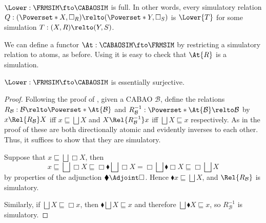 \documentclass[a4paper,UKenglish,cleveref, autoref]{lipics-v2021}
\begin{document}
\begin{lemma}
  \label{lemma:lower-frmsim-full}
  \(\Lower : \FRMSIM \fto \CABAOSIM\) is full. In other words, every simulatory
  relation
  \(Q : (\Powerset*{X}, \Box_R) \relto (\Powerset*{Y}, \Box_S)\)
  is \(\Lower{T}\) for some simulation \(T : (X, R) \relto (Y, S)\).
\end{lemma}

We can define a functor \(\At : \CABAOSIM \fto \FRMSIM\) by
restricting a simulatory relation to atoms, as before. Using
 it is easy to check that \(\At{R}\) is a
simulation.

\begin{lemma}
  \label{lemma:lower-frmsim-dense}
  \(\Lower : \FRMSIM \fto \CABAOSIM\) is essentially surjective.
\end{lemma}
\begin{proof}
  Following the proof of ,
  given a CABAO \(\mathcal{B}\), define the relations
  \(R_{\mathcal{B}} : \mathcal{B} \relto \Powerset*{\At{\mathcal{B}}}\) and
  \(R_{\mathcal{B}}^{-1} : \Powerset*{\At{\mathcal{B}}} \relto \mathcal{B}\)
  by
  \(x \Rel{R_{\mathcal{B}}} X\) iff \(x \sqsubseteq \bigsqcup X\)
  and
  \(X \Rel{R^{-1}_{\mathcal{B}}} x\) iff \(\bigsqcup X \sqsubseteq x\)
  respectively.
  As in the proof of  these are both directionally
  atomic and evidently inverses to each other. Thus, it suffices to show that
  they are simulatory.

  Suppose that \(x \sqsubseteq \bigsqcup \Box X\), then
  \[
    x
    \sqsubseteq \bigsqcup \Box X
    \sqsubseteq \Box \blacklozenge \bigsqcup \Box X
    = \Box \bigsqcup \blacklozenge \Box X
    \sqsubseteq \Box \bigsqcup X
  \]
  by properties of the adjunction $\blacklozenge \Adjoint \Box$.
  Hence $\blacklozenge x \sqsubseteq \bigsqcup X$, and $\Rel{R_\mathcal{B}}$ is
  simulatory.

  Similarly, if \(\bigsqcup X \sqsubseteq \Box x\), then \(\blacklozenge
  \bigsqcup X \sqsubseteq x\) and therefore \(\bigsqcup \blacklozenge X
  \sqsubseteq x\), so \(R_{\mathcal{B}}^{-1}\) is simulatory.
\end{proof}
\end{document}
